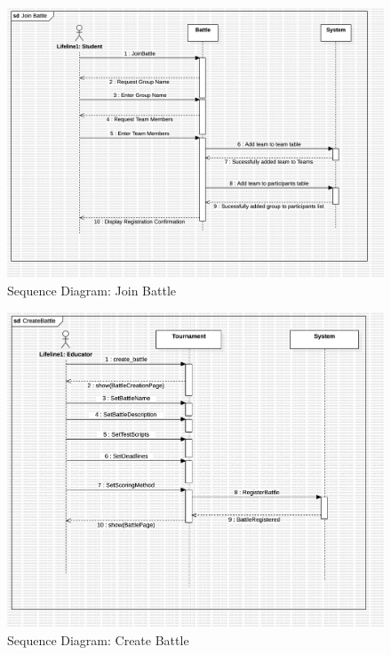 \begin{figure}[Htbp!]
    \centering
    \includegraphics[width=\textwidth]{Graphics/Sequence Diagrams/Join Battle.png}
    \caption{Sequence Diagram: Join Battle}
    \label{fig:Join}
\end{figure}

\newpage

\begin{figure}[Htbp!]
    \centering
    \includegraphics[width=\textwidth]{Graphics/Sequence Diagrams/CreateBattle.png}
    \caption{Sequence Diagram: Create Battle}
    \label{fig:CreateBattle}
\end{figure}



